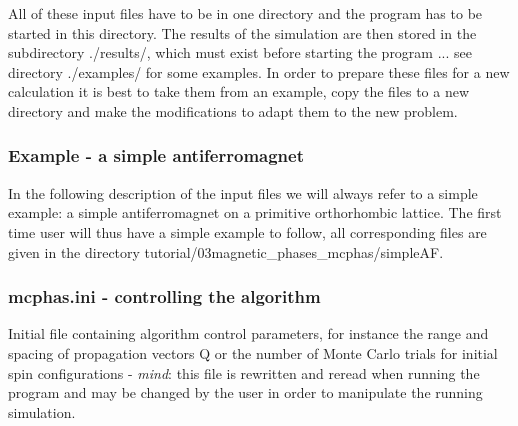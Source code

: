  All
 of these input files have to be in one directory and the program
has to be started in this directory. The results of the simulation
are then stored in the  subdirectory ./results/, which must exist before starting
the program 
... see directory ./examples/ for some examples.
 In order to prepare these files
for a new calculation it is best to take them from an example, copy the files
to a new directory and make the
modifications  to adapt them to the new problem.

\subsubsection{Example - a simple antiferromagnet}

In the following description of the input files we will always refer
to a simple example: a simple antiferromagnet
on a primitive orthorhombic lattice. The first time user
will thus have a simple example to follow, all corresponding
files are given in the directory {\prg tutorial/03magnetic\_phases\_mcphas/simpleAF}.
 

\subsubsection{{\prg mcphas.ini} - controlling the algorithm}
   Initial file containing algorithm control parameters, for instance the range and spacing of
   propagation vectors Q or the number of Monte Carlo trials for initial spin configurations
    - {\em mind}: this
   file is rewritten and reread  when running the program and may be changed by the
   user in order to manipulate the running simulation.


